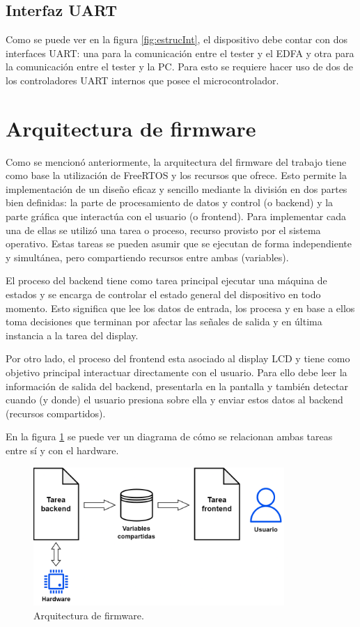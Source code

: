 \subsection{Interfaz UART}

Como se puede ver en la figura \ref{fig:estrucInt}, el dispositivo debe contar con dos interfaces UART: una para la comunicación entre el tester y el EDFA y otra para la comunicación entre el tester y la PC. Para esto se requiere hacer uso de dos de los controladores UART internos que posee el microcontrolador.

\section{Arquitectura de firmware}

Como se mencionó anteriormente, la arquitectura del firmware del trabajo tiene como base la utilización de FreeRTOS y los recursos que ofrece. Esto permite la implementación de un diseño eficaz y sencillo mediante la división en dos partes bien definidas: la parte de procesamiento de datos y control (o backend) y la parte gráfica que interactúa con el usuario (o frontend). Para implementar cada una de ellas se utilizó una tarea o proceso, recurso provisto por el sistema operativo. Estas tareas se pueden asumir que se ejecutan de forma independiente y simultánea, pero compartiendo recursos entre ambas (variables).

El proceso del backend tiene como tarea principal ejecutar una máquina de estados y se encarga de controlar el estado general del dispositivo en todo momento. Esto significa que lee los datos de entrada, los procesa y en base a ellos toma decisiones que terminan por afectar las señales de salida y en última instancia a la tarea del display.

Por otro lado, el proceso del frontend esta asociado al display LCD y tiene como objetivo principal interactuar directamente con el usuario. Para ello debe leer la información de salida del backend, presentarla en la pantalla y también detectar cuando (y donde) el usuario presiona sobre ella y enviar estos datos al backend (recursos compartidos). 

En la figura \ref{fig:arqFW} se puede ver un diagrama de cómo se relacionan ambas tareas entre sí y con el hardware.

\begin{figure}[H]
\centering
\includegraphics[width=0.85\textwidth]{./Figures/arqFW.png}
\caption{Arquitectura de firmware.}
\label{fig:arqFW}
\end{figure}

